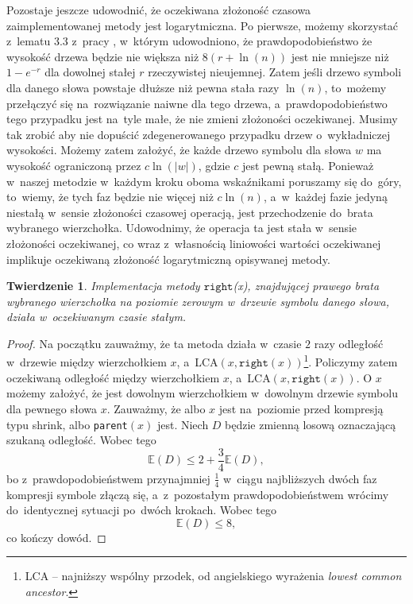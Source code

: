 \documentclass[declaration,shortabstract]{iithesis}
\theoremstyle{definition} \newtheorem{definition}{Definicja}[chapter]
\theoremstyle{plain} \newtheorem{remark}[definition]{Obserwacja}
\theoremstyle{plain} \newtheorem{theorem}[definition]{Twierdzenie}
\theoremstyle{plain} \newtheorem{example}{Przykład}[definition]
\theoremstyle{plain} \newtheorem{lemma}[definition]{Lemat}
\begin{document}
Pozostaje jeszcze udowodnić, że oczekiwana złożoność czasowa zaimplementowanej metody jest logarytmiczna. Po pierwsze, możemy skorzystać z~lematu 3.3 z~pracy \cite{gawrychowski}, w~którym udowodniono, że prawdopodobieństwo że wysokość drzewa będzie nie większa niż $8(r + \ln (n))$ jest nie mniejsze niż $1 - e^{-r}$ dla dowolnej stałej $r$ rzeczywistej nieujemnej. Zatem jeśli drzewo symboli dla danego słowa powstaje dłuższe niż pewna stała razy $\ln (n)$, to~możemy przełączyć się na~rozwiązanie naiwne dla tego drzewa, a~prawdopodobieństwo tego przypadku jest na~tyle małe, że nie zmieni złożoności oczekiwanej. Musimy tak zrobić aby nie dopuścić zdegenerowanego przypadku drzew o~wykładniczej wysokości. Możemy zatem założyć, że każde drzewo symbolu dla słowa $w$ ma wysokość ograniczoną przez $c\ln(|w|)$, gdzie $c$ jest pewną stałą. Ponieważ w~naszej metodzie w~każdym kroku oboma wskaźnikami poruszamy się do~góry, to~wiemy, że tych faz będzie nie więcej niż $c \ln(n)$, a~w~każdej fazie jedyną niestałą w~sensie złożoności czasowej operacją, jest przechodzenie do~brata wybranego wierzchołka. Udowodnimy, że operacja ta jest stała w~sensie złożoności oczekiwanej, co wraz z~własnością liniowości wartości oczekiwanej implikuje oczekiwaną złożoność logarytmiczną opisywanej metody.

\begin{theorem}
    Implementacja metody $\texttt{right}$(x), znajdującej prawego brata wybranego wierzchołka na poziomie zerowym w~drzewie symbolu danego słowa, działa w~oczekiwanym czasie stałym.
\end{theorem}

\begin{proof}
    Na początku zauważmy, że ta metoda działa w~czasie $2$ razy odległość w~drzewie między wierzchołkiem $x$, a~LCA$(x, \texttt{right}(x))$\footnote{LCA -- najniższy wspólny przodek, od angielskiego wyrażenia \textit{lowest common ancestor}.}. Policzymy zatem oczekiwaną odległość między wierzchołkiem $x$, a~LCA$(x, \texttt{right}(x))$. O $x$ możemy założyć, że jest dowolnym wierzchołkiem w~dowolnym drzewie symbolu dla pewnego słowa $x$. Zauważmy, że albo $x$ jest na~poziomie przed kompresją typu shrink, albo \texttt{parent}$(x)$ jest. Niech $D$ będzie zmienną losową oznaczającą szukaną odległość. Wobec tego $$\mathbb{E} (D) \leq 2 + \frac{3}{4} \mathbb{E} (D),$$ bo z~prawdopodobieństwem przynajmniej $\frac{1}{4}$ w~ciągu najbliższych dwóch faz kompresji symbole złączą się, a~z~pozostałym prawdopodobieństwem wrócimy do~identycznej sytuacji po~dwóch krokach. Wobec tego $$\mathbb{E} (D) \leq 8,$$ co kończy dowód.
\end{proof}
\end{document}
